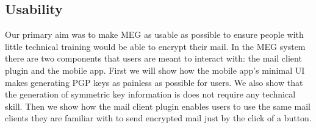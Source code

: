 \documentclass[10pt]{article}
\begin{document}
\begin{multicols}{2}
\section{Usability}
Our primary aim was to make MEG as usable as possible to ensure people with little technical training would be able to encrypt their mail. In the MEG system there are two components that users are meant to interact with: the mail client plugin and the mobile app. First we will show how the mobile app's minimal UI makes generating PGP keys as painless as possible for users. We also show that the generation of symmetric key information is  does not require any technical skill. Then we show how the mail client plugin enables users to use the same mail clients they are familiar with to send encrypted mail just by the click of a button.

\end{multicols}
\end{document}
